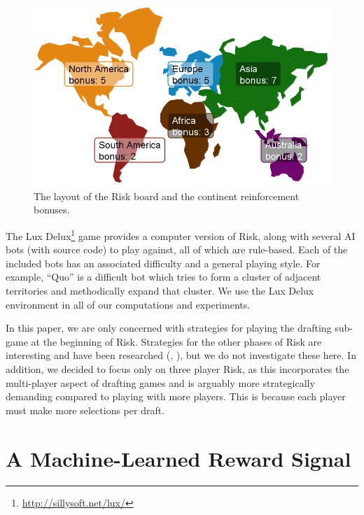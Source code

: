 \documentclass[letterpaper]{article}
\numberwithin{equation}{section}
\numberwithin{theorem}{section}
\numberwithin{lemma}{section}
\numberwithin{df}{section}
\begin{document}
\begin{figure}[t]
	\centering
	\includegraphics[scale=0.325]{figs/Conts.png}
	\caption{The layout of the Risk board and the continent reinforcement bonuses.}
	\label{fig:Conts}
\end{figure}

The Lux Delux\footnote{\url{http://sillysoft.net/lux/}} game provides a computer version of Risk, along with several AI bots (with source code) to play against, all of which are rule-based.  Each of the included bots has an associated difficulty and a general playing style.  For example, ``Quo'' is a difficult bot which tries to form a cluster of adjacent territories and methodically expand that cluster.  We use the Lux Delux environment in all of our computations and experiments.

In this paper, we are only concerned with strategies for playing the drafting sub-game at the beginning of Risk.  Strategies for the other phases of Risk are interesting and have been researched (\cite{RiskBots}, \cite{ZuckFelnerKraus2009}), but we do not investigate these here.  In addition, we decided to focus only on three player Risk, as this incorporates the multi-player aspect of drafting games and is arguably more strategically demanding compared to playing with more players.  This is because each player must make more selections per draft.

\section{A Machine-Learned Reward Signal}
\end{document}
